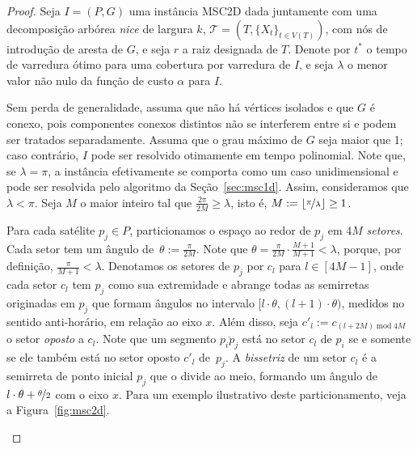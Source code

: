 \documentclass[12pt]{article}
\DeclarePairedDelimiter\floor{\lfloor}{\rfloor}
\newcommand{\calt}{\mathcal{T}}
\begin{document}
\begin{proof}
    Seja $I=(P, G)$ uma instância MSC2D dada juntamente com uma decomposição arbórea \emph{nice} de largura $k$, $\calt = {(T, \{X_t\}_{t\in V(T)})}$, com nós de introdução de aresta de $G$, e seja $r$ a raiz designada de $T$.
    Denote por $t^*$ o tempo de varredura ótimo para uma cobertura por varredura de $I$, e seja $\lambda$ o menor valor não nulo da função de custo $\alpha$ para $I$.

    Sem perda de generalidade, assuma que não há vértices isolados e que $G$ é conexo, pois componentes conexos distintos não se interferem entre si e podem ser tratados separadamente. Assuma que o grau máximo de $G$ seja maior que 1; caso contrário, $I$ pode ser resolvido otimamente em tempo polinomial.
    Note que, se $\lambda=\pi$, a instância efetivamente se comporta como um caso unidimensional e pode ser resolvida pelo algoritmo da Seção~\ref{sec:msc1d}. Assim, consideramos que $\lambda<\pi$. Seja $M$ o maior inteiro tal que $\frac{2\pi}{2M}\ge\lambda$, isto é, $M:=\floor{\nicefrac{\pi}{\lambda}}\ge 1$.

    Para cada satélite $p_j \in P$, particionamos o espaço ao redor de $p_j$ em $4M$ \emph{setores}.
    Cada setor tem um ângulo de~${\theta:=\frac{\pi}{2M}}$.
    Note que $\theta = \frac{\pi}{2M}\cdot \frac{M+1}{M+1} < \lambda$, porque, por definição, $\frac{\pi}{M+1} < \lambda$.
    Denotamos os setores de $p_j$ por $c_l$ para $l \in [4M-1]$, onde cada setor $c_l$ tem $p_j$ como sua extremidade e abrange todas as semirretas originadas em $p_j$ que formam ângulos no intervalo $[l \cdot \theta, (l+1) \cdot \theta)$, medidos no sentido anti-horário, em relação ao eixo $x$.
    Além disso, seja \mbox{$c'_l := c_{(l+2M) \mathbin{\text{ mod }} 4M}$} o setor \emph{oposto} a $c_l$.
    Note que um segmento $\overline{p_ip_j}$ está no setor $c_l$ de $p_i$ se e somente se ele também está no setor oposto $c'_l$ de~$p_j$.
    A \emph{bissetriz} de um setor $c_l$ é a semirreta de ponto inicial $p_j$ que o divide ao meio, formando um ângulo de $l\cdot\theta + \nicefrac{\theta}{2}$ com o eixo $x$.
    Para um exemplo ilustrativo deste particionamento, veja a Figura~\ref{fig:msc2d}.

    \begin{figure}[!h]
        \centering
\end{figure}
\end{proof}
\end{document}

